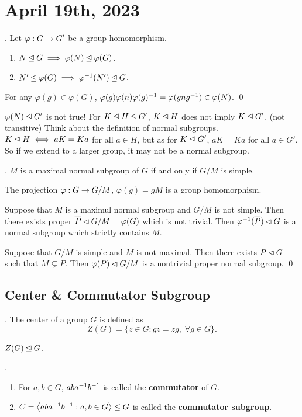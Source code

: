 \section*{April 19th, 2023}

\prop. Let \(\varphi : G \rightarrow G'\) be a group homomorphism.
\begin{enumerate}
    \item \(N \unlhd G \implies \varphi(N) \unlhd \varphi(G)\).
    \item \(N' \unlhd \varphi(G) \implies \varphi^{-1}(N') \unlhd G\).
\end{enumerate}

\pf For any \(\varphi(g) \in \varphi(G)\), \(\varphi(g) \varphi(n) \varphi(g)^{-1} = \varphi(gng^{-1}) \in \varphi(N)\). \qed

\rmk \(\varphi(N) \unlhd G'\) is not true! For \(K \unlhd H \unlhd G'\), \(K \unlhd H\) does not imply \(K \unlhd G'\). (not transitive) Think about the definition of normal subgroups. \(K \unlhd H \iff aK = Ka\) for all \(a \in H\), but as for \(K \unlhd G'\), \(aK = Ka\) for all \(a \in G'\). So if we extend to a larger group, it may not be a normal subgroup.

\thm. \(M\) is a maximal normal subgroup of \(G\) if and only if \(G/M\) is simple.

\pf The projection \(\varphi: G \rightarrow G/M\), \(\varphi(g) = gM\) is a group homomorphism.

\note{\mimp} Suppose that \(M\) is a maximul normal subgroup and \(G/M\) is not simple. Then there exists proper \(\bar{P} \pnsub G/M = \varphi(G)\) which is not trivial. Then \(\varphi\inv(\bar{P}) \pnsub G\) is a normal subgroup which strictly contains \(M\).

\note{\mimpd} Suppose that \(G/M\) is simple and \(M\) is not maximal. Then there exists \(P \lhd G\) such that \(M \subsetneq P\). Then \(\varphi(P) \lhd G/M\) is a nontrivial proper normal subgroup. \qed

\subsection*{Center \& Commutator Subgroup}

.  The center of a group \(G\) is defined as
\[
    Z(G) = \{z \in G : gz = zg,\; \forall g \in G\}.
\]

\rmk \(Z(G) \unlhd G\).

. 
\begin{enumerate}
    \item For \(a, b \in G\), \(aba^{-1} b^{-1}\) is called the \textbf{commutator} of \(G\).
    \item \(C = \left\langle aba^{-1} b^{-1} : a, b \in G \right\rangle \leq G\) is called the \textbf{commutator subgroup}.
\end{enumerate}


